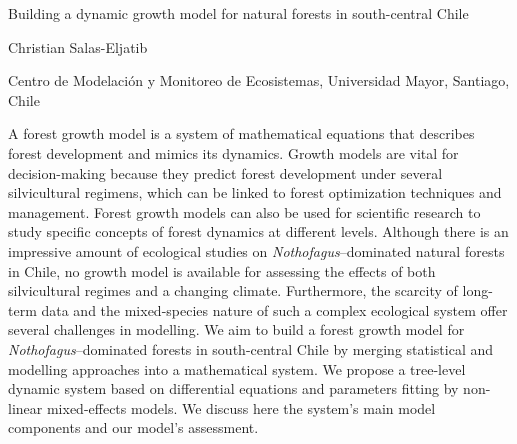 \documentclass[a4paper]{article}
\begin{document}

\Large
 \begin{center}
Building a dynamic growth model for natural forests in south-central Chile\\ 

\hspace{10pt}

\large
Christian Salas-Eljatib\\

\hspace{10pt}

\small  
Centro de Modelaci\'on y Monitoreo de Ecosistemas, Universidad Mayor, Santiago, Chile\\

\end{center}

\hspace{10pt}

\normalsize
A forest growth model is a system of mathematical equations that describes forest development and mimics its dynamics. Growth models are vital for decision-making because they predict forest development under several silvicultural regimens, which can be linked to forest optimization techniques and management. Forest growth models can also be used for scientific research to
study specific concepts of forest dynamics at different levels. Although there is an impressive amount of ecological studies on {\it Nothofagus}--dominated natural forests in Chile, no growth model is available for assessing the effects of both silvicultural regimes and a changing climate. Furthermore, the scarcity of long-term data and the mixed-species nature of such a complex ecological system offer several challenges in modelling. We aim to build a forest growth model for {\it Nothofagus}--dominated forests in south-central Chile by merging statistical and modelling approaches into a mathematical system. We propose a tree-level dynamic system based on differential equations and parameters fitting by non-linear mixed-effects models. We discuss here the system’s main model components and our model’s assessment.
\end{document}
